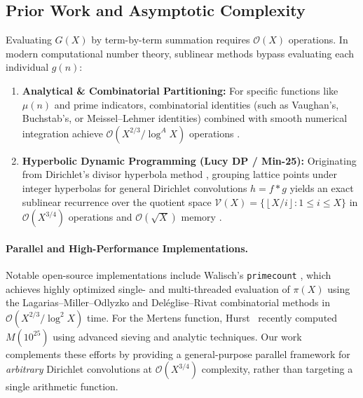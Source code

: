 \documentclass[11pt,a4paper]{article}
\theoremstyle{plain}
\theoremstyle{definition}
\newcommand{\V}{\mathcal{V}}
\newcommand{\Oh}{\mathcal{O}}
\newcommand{\floor}[1]{\left\lfloor #1 \right\rfloor}
\begin{document}
\subsection{Prior Work and Asymptotic Complexity}
Evaluating $G(X)$ by term-by-term summation requires $\Oh(X)$ operations. In modern computational number theory, sublinear methods bypass evaluating each individual $g(n)$:
\begin{enumerate}
    \item \textbf{Analytical \& Combinatorial Partitioning:} For specific functions like $\mu(n)$ and prime indicators, combinatorial identities (such as Vaughan's, Buchstab's, or Meissel--Lehmer identities) combined with smooth numerical integration achieve $\Oh(X^{2/3} / \log^A X)$ operations \cite{deleglise1996computing, kotnik2004order, kuznetsov2011computing, lagarias1985computing}.
    \item \textbf{Hyperbolic Dynamic Programming (Lucy DP / Min-25):} Originating from Dirichlet's divisor hyperbola method \cite{dirichlet1849uber}, grouping lattice points under integer hyperbolas for general Dirichlet convolutions $h = f * g$ yields an exact sublinear recurrence over the quotient space $\V(X) = \{\floor{X/i} : 1 \le i \le X\}$ in $\Oh(X^{3/4})$ operations and $\Oh(\sqrt{X})$ memory \cite{lucy2011algorithm, min25sieve, crandall2005prime}.
\end{enumerate}

\paragraph{Parallel and High-Performance Implementations.}
Notable open-source implementations include Walisch's \texttt{primecount} \cite{walisch2024primecount}, which achieves highly optimized single- and multi-threaded evaluation of $\pi(X)$ using the Lagarias--Miller--Odlyzko and Del{\'e}glise--Rivat combinatorial methods in $\Oh(X^{2/3} / \log^2 X)$ time. For the Mertens function, Hurst~\cite{hurst2026practical} recently computed $M(10^{25})$ using advanced sieving and analytic techniques. Our work complements these efforts by providing a general-purpose parallel framework for \emph{arbitrary} Dirichlet convolutions at $\Oh(X^{3/4})$ complexity, rather than targeting a single arithmetic function.
\end{document}
